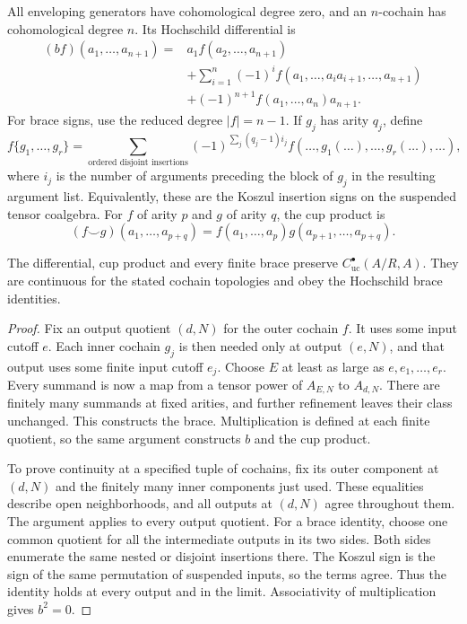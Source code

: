 All enveloping generators have cohomological degree zero, and an
$n$-cochain has cohomological degree $n$. Its Hochschild differential is
\begin{align*}
 (bf)(a_1,\ldots,a_{n+1})={}&a_1f(a_2,\ldots,a_{n+1})\\
 &+\sum_{i=1}^n(-1)^i
       f(a_1,\ldots,a_i a_{i+1},\ldots,a_{n+1})\\
 &+(-1)^{n+1}f(a_1,\ldots,a_n)a_{n+1}.
\end{align*}
For brace signs, use the reduced degree $|f|=n-1$.
If $g_j$ has arity $q_j$, define
\begin{equation}\label{eq:vol2-continuous-braces}
 f\{g_1,\ldots,g_r\}
   =\sum_{\text{ordered disjoint insertions}}
       (-1)^{\sum_j(q_j-1)i_j}
       f(\ldots,g_1(\ldots),\ldots,g_r(\ldots),\ldots),
\end{equation}
where $i_j$ is the number of arguments preceding the block of
$g_j$ in the resulting argument list. Equivalently, these are the
Koszul insertion signs on the suspended tensor coalgebra.
For $f$ of arity $p$ and $g$ of arity $q$, the cup product is
\[
 (f\smile g)(a_1,\ldots,a_{p+q})
   =f(a_1,\ldots,a_p)g(a_{p+1},\ldots,a_{p+q}).
\]

\begin{theorem}\label{thm:vol2-continuous-braces}
The differential, cup product and every finite brace preserve
$C^\bullet_{\mathrm{uc}}(A/R,A)$. They are continuous for the
stated cochain topologies and obey the Hochschild brace identities.
\end{theorem}

\begin{proof}
Fix an output quotient $(d,N)$ for the outer cochain $f$. It uses
some input cutoff $e$. Each inner cochain $g_j$ is then needed only
at output $(e,N)$, and that output uses some finite input cutoff
$e_j$. Choose $E$ at least as large as $e,e_1,\ldots,e_r$.
Every summand is now a map from a tensor power of $A_{E,N}$ to
$A_{d,N}$. There are finitely many summands at fixed arities, and
further refinement leaves their class unchanged. This constructs
the brace. Multiplication is defined at each finite quotient, so
the same argument constructs $b$ and the cup product.

To prove continuity at a specified tuple of cochains, fix its outer
component at $(d,N)$ and the finitely many inner components just
used. These equalities describe open neighborhoods, and all outputs
at $(d,N)$ agree throughout them. The argument applies to every
output quotient.
For a brace identity, choose one common quotient for all the
intermediate outputs in its two sides. Both sides enumerate the
same nested or disjoint insertions there. The Koszul sign is the
sign of the same permutation of suspended inputs, so the terms
agree. Thus the identity holds at every output and in the limit.
Associativity of multiplication gives $b^2=0$.
\end{proof}

